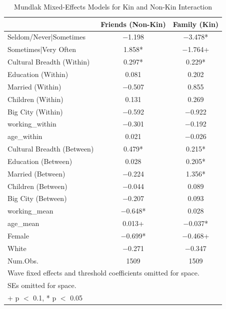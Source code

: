\begin{table}
\centering
\caption{Mundlak Mixed-Effects Models for Kin and Non-Kin Interaction}
\centering
\begin{tabular}[t]{lcc}
\toprule
  & Friends (Non-Kin) & Family (Kin)\\
\midrule
Seldom/Never|Sometimes & \num{-1.198} & \num{-3.478}*\\
Sometimes|Very Often & \num{1.858}* & \num{-1.764}+\\
Cultural Breadth (Within) & \num{0.297}* & \num{0.229}*\\
Education (Within) & \num{0.081} & \num{0.202}\\
Married (Within) & \num{-0.507} & \num{0.855}\\
Children (Within) & \num{0.131} & \num{0.269}\\
Big City (Within) & \num{-0.592} & \num{-0.922}\\
working\_within & \num{-0.301} & \num{-0.192}\\
age\_within & \num{0.021} & \num{-0.026}\\
Cultural Breadth (Between) & \num{0.479}* & \num{0.215}*\\
Education (Between) & \num{0.028} & \num{0.205}*\\
Married (Between) & \num{-0.224} & \num{1.356}*\\
Children (Between) & \num{-0.044} & \num{0.089}\\
Big City (Between) & \num{-0.207} & \num{0.093}\\
working\_mean & \num{-0.648}* & \num{0.028}\\
age\_mean & \num{0.013}+ & \num{-0.037}*\\
Female & \num{-0.699}* & \num{-0.468}+\\
White & \num{-0.271} & \num{-0.347}\\
\midrule
Num.Obs. & \num{1509} & \num{1509}\\
\bottomrule
\multicolumn{3}{l}{\rule{0pt}{1em}Wave fixed effects and threshold coefficients omitted for space.}\\
\multicolumn{3}{l}{\rule{0pt}{1em}SEs omitted for space.}\\
\multicolumn{3}{l}{\rule{0pt}{1em}+ p $<$ 0.1, * p $<$ 0.05}\\
\end{tabular}
\end{table}
